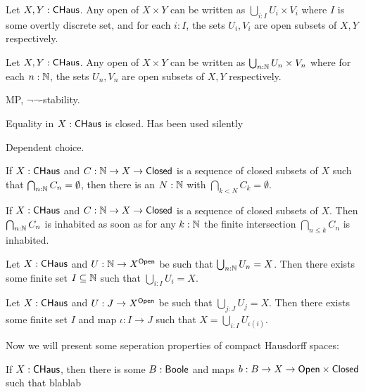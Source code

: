 \begin{lemma}\label{ProductTopology}
  Let $X,Y:\mathsf{CHaus}$. Any open of $X\times Y$ can be written as $\bigcup_{i:I} U_i \times V_i$ where $I$ is some overtly discrete set, and for each $i:I$, the sets $U_i,V_i$ are open subsets of $X,Y$ respectively. 
\end{lemma}
\begin{corollary}\label{countableProductTopology}
  Let $X,Y:\mathsf{CHaus}$. Any open of $X\times Y$ can be written as $\bigcup_{n:\mathbb{N}} U_n \times V_n$ where for each $n:\mathbb{N}$, the sets $U_n,V_n$ are open subsets of $X,Y$ respectively. 
\end{corollary}

\begin{lemma}
  MP, $\neg\neg$-stability.
\end{lemma}
\begin{lemma}
  Equality in $X:\mathsf{CHaus}$ is closed. Has been used silently
\end{lemma}
\begin{axiom}
  Dependent choice. 
\end{axiom}

\begin{lemma}
  If $X:\mathsf{CHaus}$ and $C:\mathbb{N} \to X \to \mathsf{Closed}$ is a sequence of closed subsets of $X$ such that $\bigcap_{n:\mathbb{N}} C_n = \emptyset$, then there is an $N:\mathbb{N}$ with $\bigcap_{k<N}C_k = \emptyset$. 
\end{lemma}
\begin{lemma}\label{inhabitedIntersection}
  If $X:\mathsf{CHaus}$ and $C:\mathbb{N} \to X \to \mathsf{Closed}$ is a sequence of closed subsets of $X$. Then $\bigcap_{n:\mathbb{N}} C_n$ is inhabited as soon as for any $k:\mathbb{N}$ the finite intersection $\bigcap_{n\leq k}C_n$ is inhabited. 
\end{lemma}

\begin{lemma}\label{subcoverN} Let $X:\mathsf{CHaus}$ and $U:\mathbb{N} \to X^{\mathsf{Open}}$ be such that $\bigcup_{n:\mathbb{N}} U_n = X$. 
  Then there exists some finite set $I\subseteq \mathbb{N}$ such that $\bigcup_{i:I} U_i = X$. 
\end{lemma}
\begin{corollary}\label{subcover}
  Let $X:\mathsf{CHaus}$ and $U:J \to X^{\mathsf{Open}}$ be such that $\bigcup_{j:J} U_j = X$. Then there exists some finite set $I$ and map $\iota:I \to J$ such that $X = \bigcup_{i:I} U_{\iota(i)}$. 
\end{corollary}


Now we will present some seperation properties of compact Hausdorff spaces:
\begin{lemma}
  If $X:\mathsf{CHaus}$, then there is some $B:\mathsf{Boole}$ and maps $b : B \to X \to \mathsf{Open} \times \mathsf{Closed}$ such that blablab
\end{lemma}


